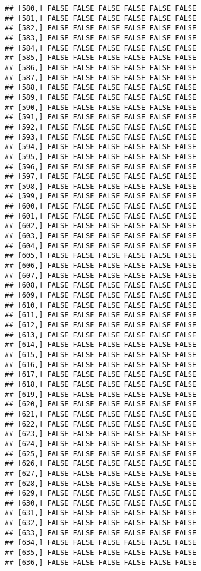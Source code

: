 \documentclass[
]{article}
\begin{document}
\begin{verbatim}
## [580,] FALSE FALSE FALSE FALSE FALSE FALSE
## [581,] FALSE FALSE FALSE FALSE FALSE FALSE
## [582,] FALSE FALSE FALSE FALSE FALSE FALSE
## [583,] FALSE FALSE FALSE FALSE FALSE FALSE
## [584,] FALSE FALSE FALSE FALSE FALSE FALSE
## [585,] FALSE FALSE FALSE FALSE FALSE FALSE
## [586,] FALSE FALSE FALSE FALSE FALSE FALSE
## [587,] FALSE FALSE FALSE FALSE FALSE FALSE
## [588,] FALSE FALSE FALSE FALSE FALSE FALSE
## [589,] FALSE FALSE FALSE FALSE FALSE FALSE
## [590,] FALSE FALSE FALSE FALSE FALSE FALSE
## [591,] FALSE FALSE FALSE FALSE FALSE FALSE
## [592,] FALSE FALSE FALSE FALSE FALSE FALSE
## [593,] FALSE FALSE FALSE FALSE FALSE FALSE
## [594,] FALSE FALSE FALSE FALSE FALSE FALSE
## [595,] FALSE FALSE FALSE FALSE FALSE FALSE
## [596,] FALSE FALSE FALSE FALSE FALSE FALSE
## [597,] FALSE FALSE FALSE FALSE FALSE FALSE
## [598,] FALSE FALSE FALSE FALSE FALSE FALSE
## [599,] FALSE FALSE FALSE FALSE FALSE FALSE
## [600,] FALSE FALSE FALSE FALSE FALSE FALSE
## [601,] FALSE FALSE FALSE FALSE FALSE FALSE
## [602,] FALSE FALSE FALSE FALSE FALSE FALSE
## [603,] FALSE FALSE FALSE FALSE FALSE FALSE
## [604,] FALSE FALSE FALSE FALSE FALSE FALSE
## [605,] FALSE FALSE FALSE FALSE FALSE FALSE
## [606,] FALSE FALSE FALSE FALSE FALSE FALSE
## [607,] FALSE FALSE FALSE FALSE FALSE FALSE
## [608,] FALSE FALSE FALSE FALSE FALSE FALSE
## [609,] FALSE FALSE FALSE FALSE FALSE FALSE
## [610,] FALSE FALSE FALSE FALSE FALSE FALSE
## [611,] FALSE FALSE FALSE FALSE FALSE FALSE
## [612,] FALSE FALSE FALSE FALSE FALSE FALSE
## [613,] FALSE FALSE FALSE FALSE FALSE FALSE
## [614,] FALSE FALSE FALSE FALSE FALSE FALSE
## [615,] FALSE FALSE FALSE FALSE FALSE FALSE
## [616,] FALSE FALSE FALSE FALSE FALSE FALSE
## [617,] FALSE FALSE FALSE FALSE FALSE FALSE
## [618,] FALSE FALSE FALSE FALSE FALSE FALSE
## [619,] FALSE FALSE FALSE FALSE FALSE FALSE
## [620,] FALSE FALSE FALSE FALSE FALSE FALSE
## [621,] FALSE FALSE FALSE FALSE FALSE FALSE
## [622,] FALSE FALSE FALSE FALSE FALSE FALSE
## [623,] FALSE FALSE FALSE FALSE FALSE FALSE
## [624,] FALSE FALSE FALSE FALSE FALSE FALSE
## [625,] FALSE FALSE FALSE FALSE FALSE FALSE
## [626,] FALSE FALSE FALSE FALSE FALSE FALSE
## [627,] FALSE FALSE FALSE FALSE FALSE FALSE
## [628,] FALSE FALSE FALSE FALSE FALSE FALSE
## [629,] FALSE FALSE FALSE FALSE FALSE FALSE
## [630,] FALSE FALSE FALSE FALSE FALSE FALSE
## [631,] FALSE FALSE FALSE FALSE FALSE FALSE
## [632,] FALSE FALSE FALSE FALSE FALSE FALSE
## [633,] FALSE FALSE FALSE FALSE FALSE FALSE
## [634,] FALSE FALSE FALSE FALSE FALSE FALSE
## [635,] FALSE FALSE FALSE FALSE FALSE FALSE
## [636,] FALSE FALSE FALSE FALSE FALSE FALSE

\end{verbatim}
\end{document}

